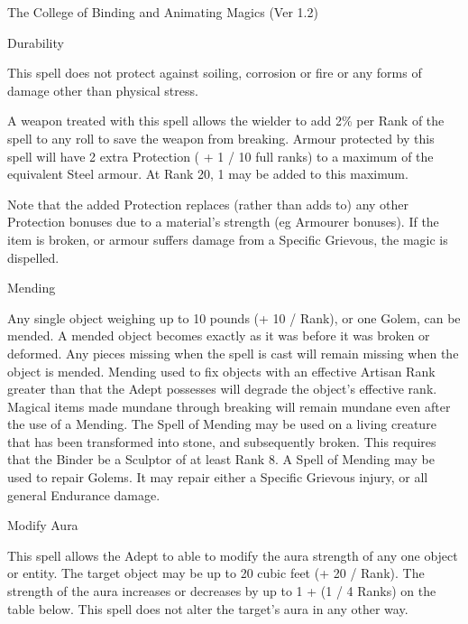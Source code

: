 \begin{Chapter}{The College of Binding and Animating Magics (Ver 1.2)}
\begin{spell}[G-4]{Durability}
\begin{effects}
This spell does not protect against soiling, corrosion or fire or any
forms of damage other than physical stress.

A weapon treated with this spell allows the wielder to add 2\% per
Rank of the spell to any roll to save the weapon from breaking.
Armour protected by this spell will have 2 extra Protection ( + 1 / 10
full ranks) to a maximum of the equivalent Steel armour.  At Rank 20,
1 may be added to this maximum.

Note that the added Protection replaces (rather than adds to) any
other Protection bonuses due to a material’s strength (eg Armourer
bonuses).  If the item is broken, or armour suffers damage from a
Specific Grievous, the magic is dispelled.
\end{effects}
\end{spell}

\begin{spell}[G-5]{Mending}

\begin{effects}
Any single object weighing up to 10 pounds (+ 10 / Rank), or one
Golem, can be mended.  A mended object becomes exactly as it was
before it was broken or deformed. Any pieces missing when the spell is
cast will remain missing when the object is mended.  Mending used to
fix objects with an effective Artisan Rank greater than that the Adept
possesses will degrade the object’s effective rank.  Magical items
made mundane through breaking will remain mundane even after the use
of a Mending.  The Spell of Mending may be used on a living creature
that has been transformed into stone, and subsequently broken.  This
requires that the Binder be a Sculptor of at least Rank 8.  A Spell of
Mending may be used to repair Golems.  It may repair either a Specific
Grievous injury, or all general Endurance damage.
\end{effects}
\end{spell}

\begin{spell}[G-6]{Modify Aura}

\begin{effects}
This spell allows the Adept to able to modify the aura strength of any
one object or entity. The target object may be up to 20 cubic feet (+
20 / Rank).  The strength of the aura increases or decreases by up to
1 + (1 / 4 Ranks) on the table below. This spell does not alter the
target’s aura in any other way.


\end{effects}
\end{spell}
\end{Chapter}
